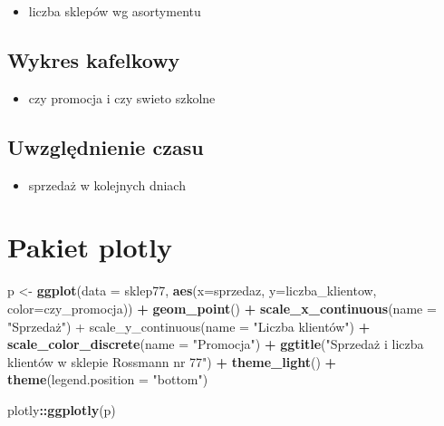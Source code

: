 \documentclass[]{book}
\newenvironment{Shaded}{\begin{snugshade}}{\end{snugshade}}
\newcommand{\KeywordTok}[1]{\textcolor[rgb]{0.13,0.29,0.53}{\textbf{#1}}}
\newcommand{\DataTypeTok}[1]{\textcolor[rgb]{0.13,0.29,0.53}{#1}}
\newcommand{\StringTok}[1]{\textcolor[rgb]{0.31,0.60,0.02}{#1}}
\newcommand{\OperatorTok}[1]{\textcolor[rgb]{0.81,0.36,0.00}{\textbf{#1}}}
\newcommand{\NormalTok}[1]{#1}
\providecommand{\tightlist}{%
  \setlength{\itemsep}{0pt}\setlength{\parskip}{0pt}}
\begin{document}
\begin{itemize}
\tightlist
\item
  liczba sklepów wg asortymentu
\end{itemize}

\subsection{Wykres kafelkowy}\label{wykres-kafelkowy}

\begin{itemize}
\tightlist
\item
  czy promocja i czy swieto szkolne
\end{itemize}

\subsection{Uwzględnienie czasu}\label{uwzglednienie-czasu}

\begin{itemize}
\tightlist
\item
  sprzedaż w kolejnych dniach
\end{itemize}

\section{Pakiet plotly}\label{pakiet-plotly}

\begin{Shaded}
\begin{Highlighting}[]
\NormalTok{p <-}\StringTok{ }\KeywordTok{ggplot}\NormalTok{(}\DataTypeTok{data =}\NormalTok{ sklep77, }\KeywordTok{aes}\NormalTok{(}\DataTypeTok{x=}\NormalTok{sprzedaz, }\DataTypeTok{y=}\NormalTok{liczba_klientow, }\DataTypeTok{color=}\NormalTok{czy_promocja)) }\OperatorTok{+}
\StringTok{  }\KeywordTok{geom_point}\NormalTok{() }\OperatorTok{+}
\StringTok{  }\KeywordTok{scale_x_continuous}\NormalTok{(}\DataTypeTok{name =} \StringTok{"Sprzedaż") +}
\StringTok{  scale_y_continuous(name = "}\NormalTok{Liczba klientów") }\OperatorTok{+}
\StringTok{  }\KeywordTok{scale_color_discrete}\NormalTok{(}\DataTypeTok{name =} \StringTok{"Promocja"}\NormalTok{) }\OperatorTok{+}
\StringTok{  }\KeywordTok{ggtitle}\NormalTok{(}\StringTok{"Sprzedaż i liczba klientów w sklepie Rossmann nr 77"}\NormalTok{) }\OperatorTok{+}
\StringTok{  }\KeywordTok{theme_light}\NormalTok{() }\OperatorTok{+}
\StringTok{  }\KeywordTok{theme}\NormalTok{(}\DataTypeTok{legend.position =} \StringTok{"bottom"}\NormalTok{)}

\NormalTok{plotly}\OperatorTok{::}\KeywordTok{ggplotly}\NormalTok{(p)}
\end{Highlighting}
\end{Shaded}
\end{document}
